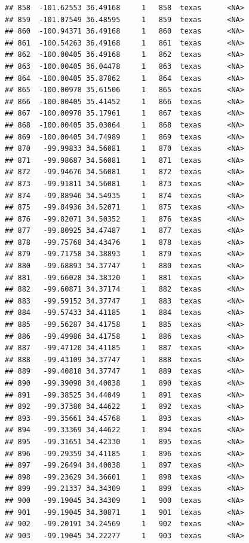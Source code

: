\documentclass[
]{article}
\begin{document}
\begin{verbatim}
## 858  -101.62553 36.49168     1   858  texas      <NA>
## 859  -101.07549 36.48595     1   859  texas      <NA>
## 860  -100.94371 36.49168     1   860  texas      <NA>
## 861  -100.54263 36.49168     1   861  texas      <NA>
## 862  -100.00405 36.49168     1   862  texas      <NA>
## 863  -100.00405 36.04478     1   863  texas      <NA>
## 864  -100.00405 35.87862     1   864  texas      <NA>
## 865  -100.00978 35.61506     1   865  texas      <NA>
## 866  -100.00405 35.41452     1   866  texas      <NA>
## 867  -100.00978 35.17961     1   867  texas      <NA>
## 868  -100.00405 35.03064     1   868  texas      <NA>
## 869  -100.00405 34.74989     1   869  texas      <NA>
## 870   -99.99833 34.56081     1   870  texas      <NA>
## 871   -99.98687 34.56081     1   871  texas      <NA>
## 872   -99.94676 34.56081     1   872  texas      <NA>
## 873   -99.91811 34.56081     1   873  texas      <NA>
## 874   -99.88946 34.54935     1   874  texas      <NA>
## 875   -99.84936 34.52071     1   875  texas      <NA>
## 876   -99.82071 34.50352     1   876  texas      <NA>
## 877   -99.80925 34.47487     1   877  texas      <NA>
## 878   -99.75768 34.43476     1   878  texas      <NA>
## 879   -99.71758 34.38893     1   879  texas      <NA>
## 880   -99.68893 34.37747     1   880  texas      <NA>
## 881   -99.66028 34.38320     1   881  texas      <NA>
## 882   -99.60871 34.37174     1   882  texas      <NA>
## 883   -99.59152 34.37747     1   883  texas      <NA>
## 884   -99.57433 34.41185     1   884  texas      <NA>
## 885   -99.56287 34.41758     1   885  texas      <NA>
## 886   -99.49986 34.41758     1   886  texas      <NA>
## 887   -99.47120 34.41185     1   887  texas      <NA>
## 888   -99.43109 34.37747     1   888  texas      <NA>
## 889   -99.40818 34.37747     1   889  texas      <NA>
## 890   -99.39098 34.40038     1   890  texas      <NA>
## 891   -99.38525 34.44049     1   891  texas      <NA>
## 892   -99.37380 34.44622     1   892  texas      <NA>
## 893   -99.35661 34.45768     1   893  texas      <NA>
## 894   -99.33369 34.44622     1   894  texas      <NA>
## 895   -99.31651 34.42330     1   895  texas      <NA>
## 896   -99.29359 34.41185     1   896  texas      <NA>
## 897   -99.26494 34.40038     1   897  texas      <NA>
## 898   -99.23629 34.36601     1   898  texas      <NA>
## 899   -99.21337 34.34309     1   899  texas      <NA>
## 900   -99.19045 34.34309     1   900  texas      <NA>
## 901   -99.19045 34.30871     1   901  texas      <NA>
## 902   -99.20191 34.24569     1   902  texas      <NA>
## 903   -99.19045 34.22277     1   903  texas      <NA>

\end{verbatim}
\end{document}
